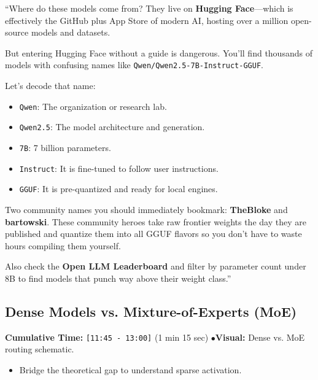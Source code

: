 \documentclass[11pt,a4paper]{article}
\begin{document}
\begin{speechbox}
``Where do these models come from? They live on \textbf{Hugging Face}---which is effectively the GitHub plus App Store of modern AI, hosting over a million open-source models and datasets.

But entering Hugging Face without a guide is dangerous. You'll find thousands of models with confusing names like \texttt{Qwen/Qwen2.5-7B-Instruct-GGUF}.

Let's decode that name:
\begin{itemize}
    \item \texttt{Qwen}: The organization or research lab.
    \item \texttt{Qwen2.5}: The model architecture and generation.
    \item \texttt{7B}: 7 billion parameters.
    \item \texttt{Instruct}: It is fine-tuned to follow user instructions.
    \item \texttt{GGUF}: It is pre-quantized and ready for local engines.
\end{itemize}

Two community names you should immediately bookmark: \textbf{TheBloke} and \textbf{bartowski}. These community heroes take raw frontier weights the day they are published and quantize them into all GGUF flavors so you don't have to waste hours compiling them yourself.

Also check the \textbf{Open LLM Leaderboard} and filter by parameter count under 8B to find models that punch way above their weight class.''
\end{speechbox}

\subsection{Dense Models vs. Mixture-of-Experts (MoE)}
\begin{directionbox}
    \textbf{Cumulative Time:} \texttt{[11:45 - 13:00]} (1 min 15 sec) \quad$\bullet$\quad \textbf{Visual:} Dense vs. MoE routing schematic.
    \begin{itemize}
        \item Bridge the theoretical gap to understand sparse activation.
    \end{itemize}
\end{directionbox}
\end{document}
